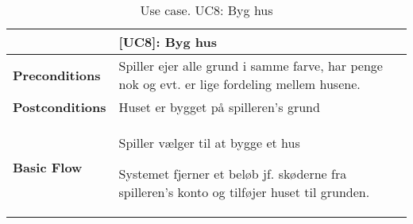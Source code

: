 \documentclass[class=article, crop=false]{standalone}
\begin{document}
    \begin{table}[H]
        \caption{Use case. UC8: Byg hus}
        \begin{tabularx}{\textwidth}{|l|X|}
            \hline
            & \textbf{[UC8]: Byg hus}   \\ \hline
            \textbf{Preconditions}       & Spiller ejer alle grund i samme farve, har penge nok og evt. er lige fordeling mellem husene.\\ \hline
            \textbf{Postconditions}      & Huset er bygget på spilleren's grund\\ \hline


            \textbf{Basic Flow} & \begin{tabenum}
                                      \item Spiller vælger til at bygge et hus
                                      \item Systemet fjerner et beløb jf. skøderne fra spilleren's konto og tilføjer huset til grunden.
            \end{tabenum}   \\ \hline

        \end{tabularx}


    \end{table}
\end{document}
